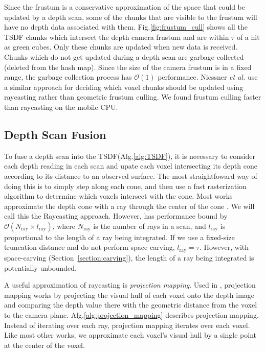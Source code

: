 \documentclass[conference]{IEEEtran}
\newcommand{\sref}[1]{Section~\ref{#1}}
\newcommand{\figref}[1]{Fig.\ref{#1}}
\newcommand{\algoref}[1]{Alg.\ref{#1}}
\newcommand{\etal}{\textit{et al.}\xspace}
\newcommand{\TSDF}{TSDF\xspace}
\begin{document}
Since the frustum is a conservative approximation of the space that could be
updated by a depth scan, some of the chunks that are visible to the frustum will
have no depth data associated with them. \figref{fig:frustum_cull} shows all the
\TSDF chunks which intersect the depth camera frustum and are within $\tau$ of
a hit as green cubes. Only these chunks are updated when new data is received. 
Chunks which do not get updated during a depth scan are garbage collected
(deleted from the hash map). Since the size of the camera frustum is in a fixed
range, the garbage collection process has $\mathcal{O}(1)$ performance. Niessner
\etal \cite{NiessnerHashing} use a similar approach for deciding which voxel
chunks should be updated using raycasting rather than geometric frustum
culling. We found frustum culling faster than raycasting on the mobile CPU.

\subsection{Depth Scan Fusion}
\label{section:scan_integration}
To fuse a depth scan into the \TSDF (\algoref{alg:TSDF}), it is necessary
to consider each depth reading in each scan and upate each
voxel intersecting its depth cone according to its distance to an observed
surface. The most straightfoward way of doing this is to simply step along
each cone, and then use a fast rasterization algorithm \cite{RayTracing} to determine which voxels
intersect with the cone. Most works  approximate the depth cone with a ray
through the center of the cone \cite{Newcombe, NiessnerHashing}. We will call
this the Raycasting approach. However, has performance bound by
$\mathcal{O}(N_{\text{ray}} \times l_{\text{ray}})$, where $N_{\text{ray}}$ is
the number of rays in a scan, and $l_{\text{ray}}$  is proportional to the
length of a ray being integrated. If we use a fixed-size truncation distance
and do not perform space carving, $l_{\text{ray}} = \tau$.
However, with space-carving (\sref{section:carving}), the length of a ray
being integrated is potentially unbounded.

A useful approximation of raycasting is \textit{projection mapping}. Used in
\cite{Newcombe,Nguyen2012, Bylow2013, Klingensmith2014}, projection mapping
works by projecting the visual hull of each voxel onto the depth image and
comparing the depth value there with the geometric distance from the voxel to
the camera plane. \algoref{alg:projection_mapping} describes projection mapping.
Instead of iterating over each ray, projection mapping iterates over each voxel.
Like most other works, we approximate each voxel's visual hull by a single point
at the center of the voxel.
\end{document}
